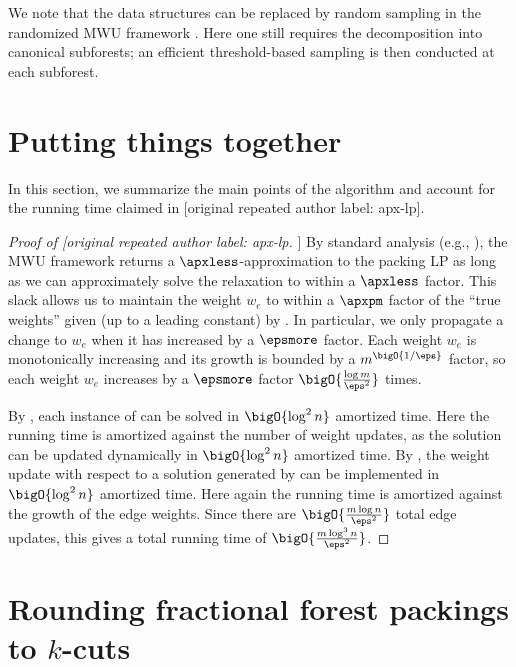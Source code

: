\documentclass[11pt]{article}
\numberwithin{equation}{section}
\theoremstyle{definition}
\theoremstyle{plain}
\newcommand{\weight}[1]{w_{#1}}
\newcommand{\wrt}{with respect to\xspace} %
\begin{document}
We note that the  data structures can be replaced
by random sampling in the randomized MWU framework
\cite{cq-18-soda}. Here one still requires the decomposition into
canonical subforests; an efficient threshold-based sampling is then
conducted at each subforest.

\section{Putting things together}
 In this section, we summarize the main points
of the algorithm and account for the running time claimed in
[original repeated author label: apx-lp].

%
%
%
%
\begin{proof}[Proof of [original repeated author label: apx-lp]]
  By standard analysis (e.g., \cite[Theorem 2.1]{cq-17-soda}), the MWU
  framework returns a $\apxless$-approximation %
  to the packing LP  as long as we can
%
approximately solve %
the relaxation  to within a
  $\apxless$ factor. %
This slack allows us to maintain
  the weight $\weight{e}$ to within a $\apxpm$ factor %
  of the ``true weights'' given (up to a leading constant) by
  .  In particular, we only propagate a
  change to $\weight{e}$ when it has increased by a
  $\epsmore$ factor.  %
Each weight $\weight{e}$ is
  monotonically increasing and its growth is bounded by a
  $m^{\bigO{1/\eps}}$ factor,   %
so each weight
  $\weight{e}$ increases by a $\epsmore$ factor  %
  $\bigO{\frac{\log m}{\eps^2}}$ times.


  By , each instance of
   can be solved in $\bigO{\log^2 n}$
  amortized time. Here the running time is amortized against the
  number of weight updates, as the solution can be updated dynamically
  in $\bigO{\log^2 n}$ amortized time. By
  , the weight update \wrt a solution
  generated by  can be implemented in
  $\bigO{\log^2 n}$ amortized time. Here again the running time is
  amortized against the growth of the edge weights. Since there are
  $\bigO{\frac{m \log n}{\eps^2}}$ total edge updates, this gives a
  total running time of $\bigO{\frac{m \log^3 n}{\eps^2}}$.
\end{proof}


\section{Rounding fractional forest packings to $k$-cuts}
\end{document}

